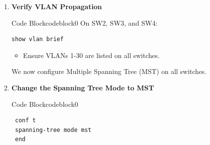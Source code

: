 \documentclass[a4paper]{book}
\begin{document}
\begin{enumerate}


	      \begin{ocg}{Code Block}{codeblock}{0}
		      \vspace{0.5cm}

		      \begin{lstlisting}
conf t
vlan 1-30
exit
end
\end{lstlisting}
	      \end{ocg}
	\item \textbf{Verify VLAN Propagation}



	      \begin{ocg}{Code Block}{codeblock}{0}
		      \vspace{0.5cm}
		      On SW2, SW3, and SW4:
		      \begin{lstlisting}
show vlan brief
\end{lstlisting}
	      \end{ocg}

	      \begin{itemize}
		      \item Ensure VLANs 1-30 are listed on all switches.
	      \end{itemize}
	      \vspace{1cm}

	      We now configure Multiple Spanning Tree (MST) on all switches.
	\item \textbf{Change the Spanning Tree Mode to MST}



	      \begin{ocg}{Code Block}{codeblock}{0}
		      \vspace{0.5cm}
		      \begin{lstlisting}
 conf t
 spanning-tree mode mst
 end
 
 \end{lstlisting}
	      \end{ocg}



\end{enumerate}
\end{document}
